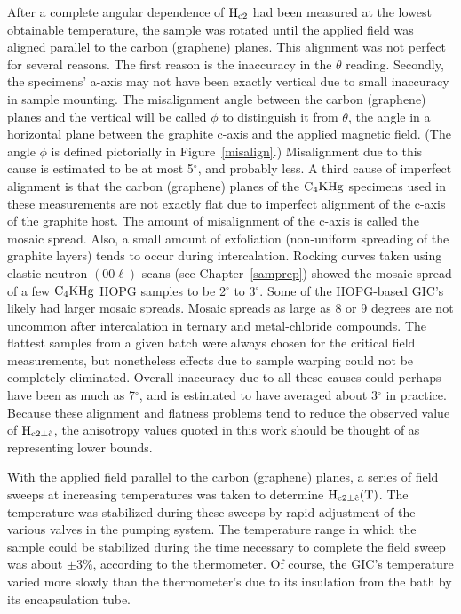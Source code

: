 	After   a  complete angular   dependence of  $\rm  H_{c2}$ had been
measured at the lowest obtainable temperature, the sample was rotated until
the  applied  field was aligned  parallel to the carbon  (graphene) planes.
This  alignment was not  perfect for several reasons.   The first reason is
the inaccuracy in the $\theta$ reading. Secondly, the specimens' a-axis may
not have been exactly vertical due to small inaccuracy in  sample mounting.
The  misalignment  angle between  the   carbon  (graphene)  planes  and the
vertical will be called $\phi$ to  distinguish it  from $\theta$, the angle
in a horizontal plane between the graphite c-axis and the  applied magnetic
field.  (The angle $\phi$ is defined pictorially in Figure~\ref{misalign}.)
Misalignment due to this cause is estimated to be at  most 5$^{\circ}$, and
probably  less.  A third  cause of  imperfect alignment  is that the carbon
(graphene) planes of the $\rm C_4KHg$ specimens used  in these measurements
are  not exactly   flat due to   imperfect alignment of  the c-axis  of the
graphite host.  The amount  of misalignment of  the  c-axis  is called  the
mosaic spread.  Also, a small amount  of exfoliation (non-uniform spreading
of  the  graphite layers) tends  to  occur  during intercalation.   Rocking
curves     taken   using     elastic  neutron   $(00\ell)$     scans   (see
Chapter~\ref{samprep}) showed the mosaic spread  of a few $\rm C_4KHg$ HOPG
samples to  be 2$^{\circ}$ to 3$^{\circ}$.   Some  of the HOPG-based  GIC's
likely  had larger mosaic  spreads.  Mosaic  spreads   as  large as  8 or 9
degrees are not uncommon after  intercalation in ternary and metal-chloride
compounds.\cite{speck88}  The  flattest samples from  a   given  batch were
always chosen for the  critical field measurements, but nonetheless effects
due to   sample  warping  could   not   be  completely eliminated.  Overall
inaccuracy  due to all  these causes  could  perhaps have been as   much as
7$^{\circ}$,  and is   estimated  to have  averaged  about  3$^{\circ}$  in
practice.  Because these alignment and flatness problems tend to reduce the
observed value of $\rm H_{c2\perp\hat{c}}$, the anisotropy values quoted in
this work should be thought of as representing lower bounds.

	With the applied field parallel to  the carbon (graphene)  planes, a series of
field  sweeps  at  increasing  temperatures   was taken  to  determine $\rm
H_{c2\perp\hat{c}}(T)$.  The temperature was stabilized during these sweeps
by   rapid adjustment of  the various  valves in  the  pumping system.  The
temperature range in which the sample could  be stabilized  during the time
necessary to complete the field sweep was about $\pm 3$\%, according to the
thermometer.  Of course, the GIC's temperature varied more  slowly than the
thermometer's  due  to its  insulation from  the bath  by its encapsulation
tube.

